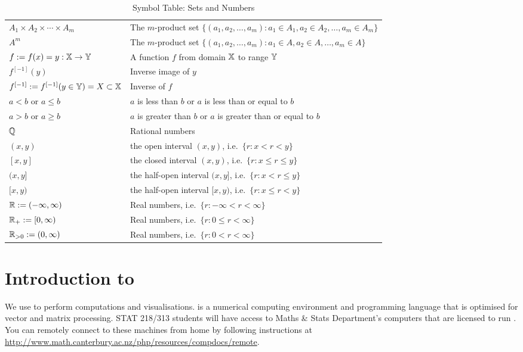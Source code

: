 \begin{table}[htb]
{\begin{tabular}{| l | l |}
$A_1 \times A_2 \times \cdots \times A_m$ & The $m$-product set $\{(a_1,a_2,\ldots,a_{m}): a_1 \in A_1, a_2 \in A_2, \ldots, a_{m} \in A_m \}$ \\
$A^m$ & The $m$-product set $\{(a_1,a_2,\ldots,a_{m}): a_1 \in A, a_2 \in A, \ldots, a_{m} \in A \}$ \\ 
$f := f(x)=y:\mathbb{X} \to \mathbb{Y}$ & A function $f$ from domain $\mathbb{X}$ to range $\mathbb{Y}$ \\
$f^{[-1]}(y)$ & Inverse image of $y$ \\ 
$f^{[-1]} := f^{[-1]}(y \in \mathbb{Y}) = X \subset \mathbb{X}$ & Inverse of $f$ \\ 
$a<b$ or $a \leq b$ & $a$ is less than $b$ or $a$ is less than or equal to $b$ \\
$a>b$ or $a \geq b$ & $a$ is greater than $b$ or $a$ is greater than or equal to $b$ \\ 
$\mathbb{Q}$ & Rational numbers \\ 
$(x,y)$ & the open interval $(x,y)$, i.e.~$\{r: x < r < y\}$ \\ 
$[x,y]$ & the closed interval $(x,y)$, i.e.~$\{r: x \leq r \leq y\}$ \\ 
$(x,y]$ & the half-open interval $(x,y]$, i.e.~$\{r: x < r \leq y\}$ \\ 
$[x,y)$ & the half-open interval $[x,y)$, i.e.~$\{r: x \leq r < y\}$ \\ 
$\mathbb{R} := (-\infty,\infty)$ & Real numbers, i.e.~$\{r: -\infty < r <  \infty \}$ \\
$\mathbb{R}_+ := [0,\infty)$ & Real numbers, i.e.~$\{r: 0 \leq r <  \infty \}$ \\
$\mathbb{R}_{>0} := (0,\infty)$ & Real numbers, i.e.~$\{r: 0 < r <  \infty \}$ \\
\hline
\end{tabular}
}
\caption{Symbol Table: Sets and Numbers \label{T:SymbTableSets}}
\end{table}

\clearpage

\section{Introduction to \Matlab}\label{S:IntroMatlab}
We use \Matlab to perform computations and visualisations. \Matlab is a numerical computing environment and programming language that is optimised for vector and matrix processing.  STAT 218/313 students will have access to Maths \& Stats Department's computers that are licensed to run \Matlab.  You can remotely connect to these machines from home by following instructions at \href{http://www.math.canterbury.ac.nz/php/resources/compdocs/remote}{\url{http://www.math.canterbury.ac.nz/php/resources/compdocs/remote}}.

